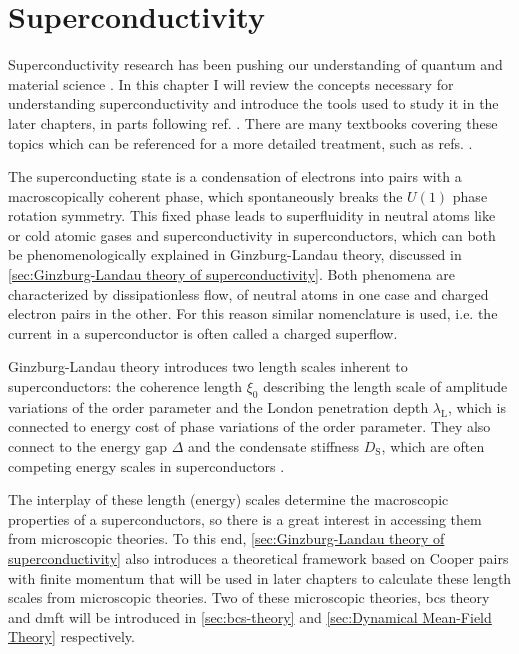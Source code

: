 \documentclass[../main.tex]{subfiles}
\begin{document}
\chapter{Superconductivity}\label{ch:superconductivity}

Superconductivity research has been pushing our understanding of quantum and material science \cite{keimerPhysicsQuantumMaterials2017}.
In this chapter I will review the concepts necessary for understanding superconductivity and introduce the tools used to study it in the later chapters, in parts following ref. \cite{wittElectronCorrelationsUnconventional}.
There are many textbooks covering these topics which can be referenced for a more detailed treatment, such as refs. \cite{colemanIntroductionManyBodyPhysics2015, tinkhamIntroductionSuperconductivity1996, bruusManyBodyQuantumTheory2004, larkinTheoryFluctuationsSuperconductors2005, bennemannSuperconductivity2008}.

The superconducting state is a condensation of electrons into pairs with a macroscopically coherent phase, which spontaneously breaks the \(U(1)\) phase rotation symmetry.
This fixed phase leads to superfluidity in neutral atoms like  or cold atomic gases and superconductivity in superconductors, which can both be phenomenologically explained in Ginzburg-Landau theory, discussed in \cref{sec:Ginzburg-Landau theory of superconductivity}.
Both phenomena are characterized by dissipationless flow, of neutral atoms in one case and charged electron pairs in the other.
For this reason similar nomenclature is used, i.e. the current in a superconductor is often called a charged superflow.

Ginzburg-Landau theory introduces two length scales inherent to superconductors: the coherence length \(\xi_0\) describing the length scale of amplitude variations of the order parameter and the London penetration depth \(\lambda_{\mathrm{L}}\), which is connected to energy cost of phase variations of the order parameter.
They also connect to the energy gap \(\Delta\) and the condensate stiffness \(D_{\mathrm{S}}\), which are often competing energy scales in superconductors \cite{emeryImportancePhaseFluctuations1995, kivelsonMakingHighTc2002}.

The interplay of these length (energy) scales determine the macroscopic properties of a superconductors, so there is a great interest in accessing them from microscopic theories.
To this end, \cref{sec:Ginzburg-Landau theory of superconductivity} also introduces a theoretical framework based on Cooper pairs with finite momentum \cite{wittBypassingLatticeBCS2024} that will be used in later chapters to calculate these length scales from microscopic theories.
Two of these microscopic theories, \gls{bcs} theory and \gls{dmft} will be introduced in \cref{sec:bcs-theory} and \cref{sec:Dynamical Mean-Field Theory} respectively.
\end{document}
